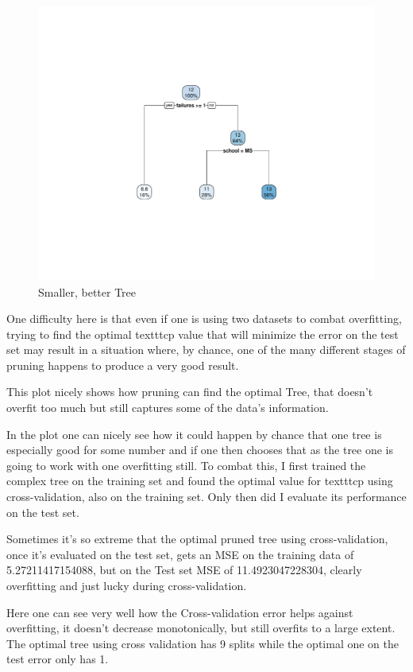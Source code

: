 \documentclass[12pt]{article}
\begin{document}
\begin{figure}
    \centering
    \includegraphics[scale=0.30]{small_manual_tree.pdf}
    \caption{Smaller, better Tree}
\end{figure}

One difficulty here is that even if one is using two datasets to combat overfitting, trying to find the optimal texttt{cp} value that will minimize the error on the test set may result in a situation where, by chance, one of the many different stages of pruning happens to produce a very good result.

This plot nicely shows how pruning can find the optimal Tree, that doesn't overfit too much but still captures some of the data's information.

In the  plot one can nicely see how it could happen by chance that one tree is especially good for some number and if one then chooses that as the tree one is going to work with one overfitting still.
To combat this, I first trained the complex tree on the training set and found the optimal value for texttt{cp} using cross-validation, also on the training set. Only then did I evaluate its performance on the test set.

Sometimes it's so extreme that the optimal pruned tree using cross-validation, once it's evaluated on the test set, gets an MSE on the training data of 5.27211417154088, but on the Test set MSE of 11.4923047228304, clearly overfitting and just lucky during cross-validation.

Here one can see very well how the Cross-validation error helps against overfitting, it doesn't decrease monotonically, but still overfits to a large extent. The optimal tree using cross validation has 9 splits while the optimal one on the test error only has 1.
\end{document}
